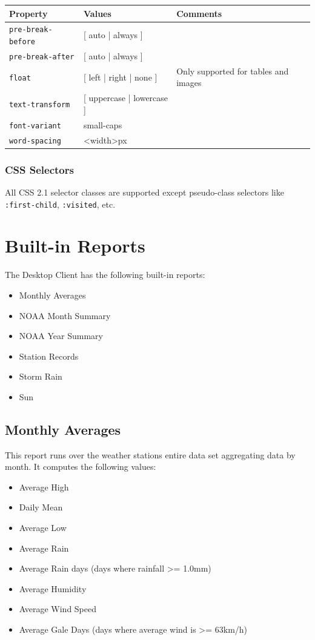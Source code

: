 \documentclass[a4paper,10pt]{book}
\begin{document}
\begin{tabular}{p{3.1cm} p{6cm} p{4.5cm}}
\hline
\textbf{Property} & \textbf{Values} & \textbf{Comments} \\
\hline

\verb|pre-break-before| & [ auto | always ] & \\
\verb|pre-break-after| & [ auto | always ] & \\
\verb|float| & [ left | right | none ] & Only supported for tables and images \\
\verb|text-transform| & [ uppercase | lowercase ] & \\
\verb|font-variant| & small-caps & \\
\verb|word-spacing| & <width>px & \\
\hline
\end{tabular}

\subsection{CSS Selectors}
All CSS 2.1 selector classes are supported except pseudo-class selectors like \verb|:first-child|, \verb|:visited|, etc.



\chapter{Built-in Reports}
\label{app_built_in_reports}
The Desktop Client has the following built-in reports:
\begin{itemize}
\item Monthly Averages
\item NOAA Month Summary
\item NOAA Year Summary
\item Station Records
\item Storm Rain
\item Sun
\end{itemize}

\section{Monthly Averages}
This report runs over the weather stations entire data set aggregating data by month. It computes the following values:
\begin{itemize}
\item Average High
\item Daily Mean
\item Average Low
\item Average Rain
\item Average Rain days (days where rainfall >= 1.0mm)
\item Average Humidity
\item Average Wind Speed
\item Average Gale Days (days where average wind is >= 63km/h)
\end{itemize}
\end{document}

